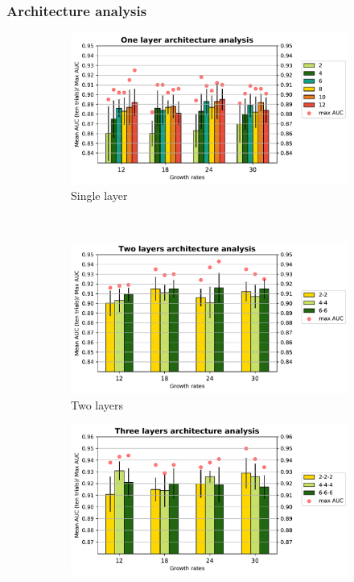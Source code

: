 \subsubsection{Architecture analysis}
\begin{figure}
    \centering
    \begin{subfigure}[b]{0.4\textwidth}
        \includegraphics[width=\textwidth]{images/densenet/simple/densenet_simple_single_layer_bar}
        \caption{Single layer }
        \label{fig:densenet_simple_single_layer_bar}
    \end{subfigure}
    ~ %
    \begin{subfigure}[b]{0.4\textwidth}
        \includegraphics[width=\textwidth]{images/densenet/simple/densenet_simple_double_layer_bar}
        \caption{Two layers}
       \label{fig:densenet_simple_double_layer_bar}
    \end{subfigure}    
    \quad
    \centering
    \begin{subfigure}[b]{0.4\textwidth}
        \includegraphics[width=\textwidth]{images/densenet/simple/densenet_simple_three_layer_bar}

\end{subfigure}
\end{figure}
